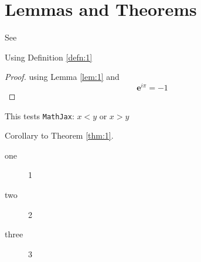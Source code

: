 \section[L and T]{Lemmas and Theorems}

\begin{Lem}[A Lemma]\label{lem:1}
  \lipsum[3]

  See \cite{wiki:it:tautol}
\end{Lem}

\begin{Theorem}\label{thm:1}
  Using Definition \ref{defn:1} \\
  \lipsum[4]
  \begin{proof}
    using Lemma \ref{lem:1} and
    \begin{equation}
      \label{eq:1}
      {\mathbf{e}}^{i \pi }=-1
    \end{equation}
  \end{proof}
  This tests \texttt{MathJax}: $x<y$ or $x>y$
\end{Theorem}

\lipsum[5]

\begin{Cor}\label{cor:1}
  Corollary to Theorem \ref{thm:1}.
  \\
  \lipsum[6]
\end{Cor}

\begin{description}
\item[one] 1
\item[two] 2 %
\item[three] 3
\end{description}


